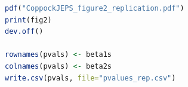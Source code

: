 \documentclass[12pt]{article}
\begin{document}
\begin{lstlisting}[language=R]
pdf("CoppockJEPS_figure2_replication.pdf")
print(fig2)
dev.off()

rownames(pvals) <- beta1s
colnames(pvals) <- beta2s
write.csv(pvals, file="pvalues_rep.csv")

\end{lstlisting}


\clearpage


\end{document}
